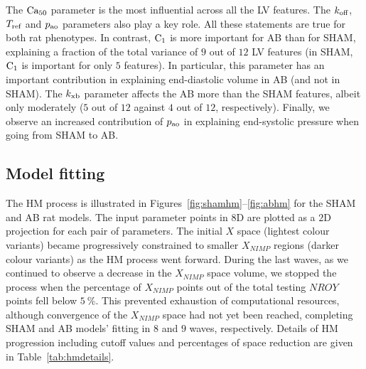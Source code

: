 \noindent
The $\textrm{Ca}_{50}$ parameter is the most influential across all the LV features. The $k_{\textrm{off}}$, $T_{\textrm{ref}}$ and $p_{\textrm{ao}}$ parameters also play a key role. All these statements are true for both rat phenotypes. In contrast, $\textrm{C}_1$ is more important for AB than for SHAM, explaining a fraction of the total variance of $9$ out of $12$ LV features (in SHAM, $\textrm{C}_1$ is important for only $5$ features). In particular, this parameter has an important contribution in explaining end-diastolic volume in AB (and not in SHAM). The $k_{\textrm{xb}}$ parameter affects the AB more than the SHAM features, albeit only moderately ($5$ out of $12$ against $4$ out of $12$, respectively). Finally, we observe an increased contribution of $p_{\textrm{ao}}$ in explaining end-systolic pressure when going from SHAM to AB.


%
%
%
\subsection{Model fitting}\label{sec:ch4modelfitting}
The HM process is illustrated in Figures~\ref{fig:shamhm}--\ref{fig:abhm} for the SHAM and AB rat models. The input parameter points in $8$D are plotted as a $2$D projection for each pair of parameters. The initial $X$ space (lightest colour variants) became progressively constrained to smaller $X_{NIMP}$ regions (darker colour variants) as the HM process went forward. During the last waves, as we continued to observe a decrease in the $X_{NIMP}$ space volume, we stopped the process when the percentage of $X_{NIMP}$ points out of the total testing $NROY$ points fell below $\SI{5}{\percent}$. This prevented exhaustion of computational resources, although convergence of the $X_{NIMP}$ space had not yet been reached, completing SHAM and AB models' fitting in $8$ and $9$ waves, respectively. Details of HM progression including cutoff values and percentages of space reduction are given in Table~\ref{tab:hmdetails}.

